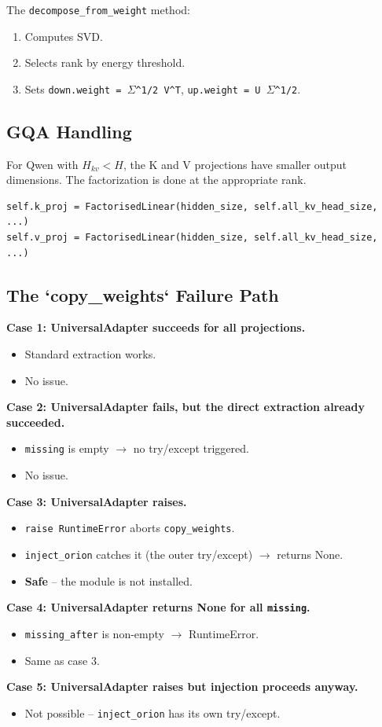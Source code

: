 The \texttt{decompose\_from\_weight} method:
\begin{enumerate}
\item Computes SVD.
\item Selects rank by energy threshold.
\item Sets \texttt{down.weight = $\Sigma$^{1/2} V^T}, \texttt{up.weight = U $\Sigma$^{1/2}}.

\end{enumerate}
\subsection{GQA Handling}

For Qwen with $H_{kv} < H$, the K and V projections have smaller output 
dimensions. The factorization is done at the appropriate rank.

\begin{lstlisting}
self.k_proj = FactorisedLinear(hidden_size, self.all_kv_head_size, ...)
self.v_proj = FactorisedLinear(hidden_size, self.all_kv_head_size, ...)
\end{lstlisting}

\subsection{The `copy\_weights` Failure Path}

\textbf{Case 1: UniversalAdapter succeeds for all projections.}
\begin{itemize}
\item Standard extraction works.
\item No issue.

\end{itemize}
\textbf{Case 2: UniversalAdapter fails, but the direct extraction already succeeded.}
\begin{itemize}
\item \texttt{missing} is empty $\to$ no try/except triggered.
\item No issue.

\end{itemize}
\textbf{Case 3: UniversalAdapter raises.}
\begin{itemize}
\item \texttt{raise RuntimeError} aborts \texttt{copy\_weights}.
\item \texttt{inject\_orion} catches it (the outer try/except) $\to$ returns None.
\item \textbf{Safe} -- the module is not installed.

\end{itemize}
\textbf{Case 4: UniversalAdapter returns None for all \texttt{missing}.}
\begin{itemize}
\item \texttt{missing\_after} is non-empty $\to$ RuntimeError.
\item Same as case 3.

\end{itemize}
\textbf{Case 5: UniversalAdapter raises but injection proceeds anyway.}
\begin{itemize}
\item Not possible -- \texttt{inject\_orion} has its own try/except.

\end{itemize}
